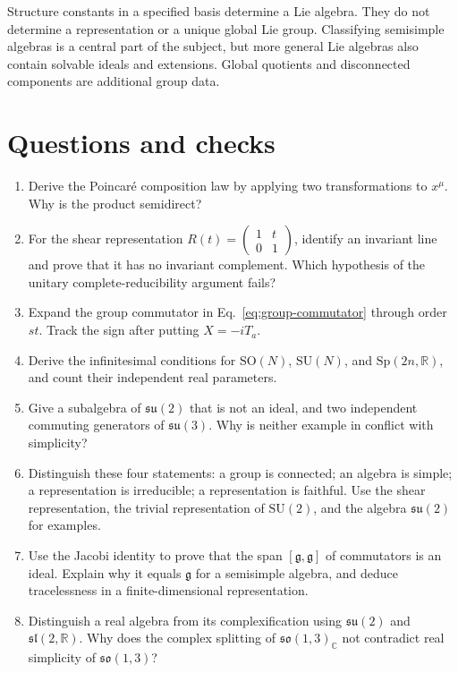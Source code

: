 \documentclass[11pt]{article}
\newcommand{\R}{\mathbb{R}}
\newcommand{\SO}{\mathrm{SO}}
\newcommand{\C}{\mathbb C}
\newcommand{\SU}{\mathrm{SU}}
\newcommand{\Sp}{\mathrm{Sp}}
\newcommand{\lieg}{\mathfrak g}
\newcommand{\su}{\mathfrak{su}}
\newcommand{\so}{\mathfrak{so}}
\newcommand{\slie}{\mathfrak{sl}}
\begin{document}
\begin{warningbox}
Structure constants in a specified basis determine a Lie algebra.
They do not determine a representation or a unique global Lie group.
Classifying semisimple algebras is a central part of the subject, but
more general Lie algebras also contain solvable ideals and extensions.
Global quotients and disconnected components are additional group data.
\end{warningbox}

\clearpage
\section*{Questions and checks}
\begin{enumerate}
\item Derive the Poincar\'e composition law by applying two transformations
to \(x^\mu\). Why is the product semidirect?
\item For the shear representation \(R(t)=\left(\begin{smallmatrix}1&t\\0&1\end{smallmatrix}\right)\),
identify an invariant line and prove that it has no invariant complement.
Which hypothesis of the unitary complete-reducibility argument fails?
\item Expand the group commutator in Eq.~\eqref{eq:group-commutator}
through order \(st\). Track the sign after putting \(X=-iT_a\).
\item Derive the infinitesimal conditions for \(\SO(N)\), \(\SU(N)\),
and \(\Sp(2n,\R)\), and count their independent real parameters.
\item Give a subalgebra of \(\su(2)\) that is not an ideal, and two
independent commuting generators of \(\su(3)\). Why is neither example
in conflict with simplicity?
\item Distinguish these four statements: a group is connected; an algebra
is simple; a representation is irreducible; a representation is faithful.
Use the shear representation, the trivial representation of \(\SU(2)\),
and the algebra \(\su(2)\) for examples.
\item Use the Jacobi identity to prove that the span \([\lieg,\lieg]\)
of commutators is an ideal. Explain why it equals \(\lieg\) for a
semisimple algebra, and deduce tracelessness in a finite-dimensional
representation.
\item Distinguish a real algebra from its complexification using
\(\su(2)\) and \(\slie(2,\R)\). Why does the complex splitting of
\(\so(1,3)_{\C}\) not contradict real simplicity of \(\so(1,3)\)?
\end{enumerate}
\end{document}
